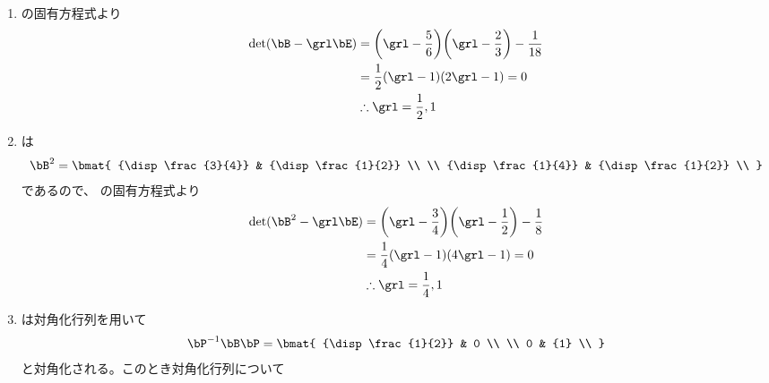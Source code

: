 \begin{ans*}
  ${}$
  \begin{enumerate}[label=(\arabic*)]
    \item \bB の固有方程式より
    \begin{align}
      \det(\bB-\grl\bE)
      &=
      \biggl(\grl-\frac{5}{6}\biggr)\biggl(\grl-\frac{2}{3}\biggr)-\frac{1}{18} \\
      &= \frac{1}{2}(\grl - 1)(2\grl - 1) = 0 \\
      &\therefore \grl = \frac{1}{2}, 1
    \end{align}
    \item
    は
    \begin{gather}
      \bB^2 =
      \bmat{
        {\disp \frac{3}{4}} & {\disp \frac{1}{2}} \\
        \\
        {\disp \frac{1}{4}} & {\disp \frac{1}{2}} \\
      }
    \end{gather}
    であるので、 の固有方程式より
    \begin{align}
      \det(\bB^2-\grl\bE)
      &=
      \biggl(\grl-\frac{3}{4}\biggr)\biggl(\grl-\frac{1}{2}\biggr)-\frac{1}{8} \\
      &= \frac{1}{4}(\grl - 1)(4\grl - 1) = 0 \\
      &\therefore \grl = \frac{1}{4}, 1
    \end{align}

    \item
    \bB は対角化行列\bP を用いて
    \begin{gather}
      \bP^{-1}\bB\bP =
      \bmat{
        {\disp \frac{1}{2}} & 0 \\
        \\
        0 & {1} \\
      }
    \end{gather}
    と対角化される。このとき対角化行列\bP について


\end{enumerate}
\end{ans*}
